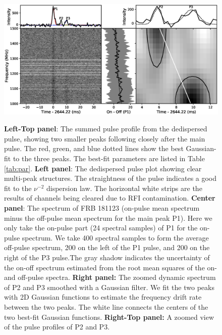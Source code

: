 \begin{figure}%
\centering
\includegraphics[scale=0.7]{dedisp_new.eps} \\ 
\caption{\label{fig:dedisp} 
{\bf Left-Top panel}: The summed pulse profile from the dedispersed pulse, showing two smaller peaks following closely after the main pulse. The red, green, and blue dotted lines show the best Gaussian-fit to the three peaks. The best-fit parameters are listed in Table \ref{tab:par}. {\bf Left panel}: The dedispersed pulse plot showing clear multi-peak structures. The straightness of the pulse indicates a good fit to the $\nu^{-2}$ dispersion law. The horizontal white strips are the results of channels being cleared due to RFI contamination. {\bf Center panel}: The spectrum of FRB 181123 (on-pulse mean spectrum minus the off-pulse mean spectrum for the main peak P1). Here we only take the on-pulse part (24 spectral samples) of P1 for the on-pulse spectrum. We take 400 spectral samples to form the average off-pulse spectrum, 200 on the left of the P1 pulse, and 200 on the right of the P3 pulse.The gray shadow indicates the uncertainty of the on-off spectrum estimated from the root mean squares of the on- and  off-pulse spectra. {\bf Right panel:} The zoomed dynamic spectrum of P2 and P3 smoothed with a Gaussian filter. We fit the two peaks with 2D Gaussian functions to estimate the frequency drift rate between the two peaks. The white line connects the centers of the two best-fit Gaussian functions. {\bf Right-Top panel:} A zoomed view of the pulse profiles of P2 and P3.}
\end{figure} 

